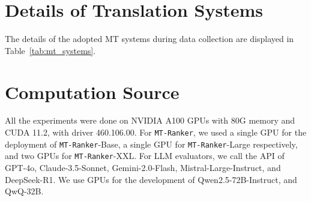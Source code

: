 \documentclass{article}
\theoremstyle{plain}
\theoremstyle{definition}
\theoremstyle{remark}
\newcommand{\rankerx}{\texttt{MT-Ranker}}
\begin{document}
\section{Details of Translation Systems}\label{appx:mt_systems}
The details of the adopted MT systems during data collection are displayed in Table~\ref{tab:mt_systems}.

\begin{table}[h]
    \centering
    \caption{Details of MT Systems. N/A indicates disclosed information.}
    \label{tab:mt_systems}
\end{table}

\section{Computation Source}
\label{appx:computation source}

All the experiments were done on NVIDIA A100 GPUs with 80G memory and CUDA 11.2, with driver 460.106.00. 
For \rankerx, we used a single GPU for the deployment of \rankerx-Base, a single GPU for \rankerx-Large respectively, and two GPUs for \rankerx-XXL. 
For LLM evaluators, we call the API of GPT-4o, Claude-3.5-Sonnet, Gemini-2.0-Flash, Mistral-Large-Instruct, and DeepSeek-R1. We use GPUs for the development of Qwen2.5-72B-Instruct, and QwQ-32B.
\end{document}
